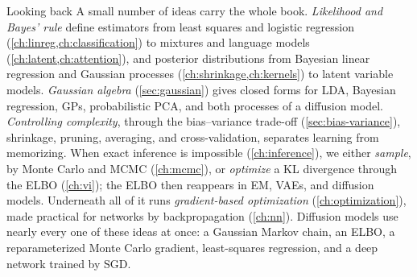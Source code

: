 \begin{notebox}{Looking back}
A small number of ideas carry the whole book. \emph{Likelihood and Bayes' rule} define estimators from least squares and logistic regression (\cref{ch:linreg,ch:classification}) to mixtures and language models (\cref{ch:latent,ch:attention}), and posterior distributions from Bayesian linear regression and Gaussian processes (\cref{ch:shrinkage,ch:kernels}) to latent variable models. \emph{Gaussian algebra} (\cref{sec:gaussian}) gives closed forms for LDA, Bayesian regression, GPs, probabilistic PCA, and both processes of a diffusion model. \emph{Controlling complexity}, through the bias--variance trade-off (\cref{sec:bias-variance}), shrinkage, pruning, averaging, and cross-validation, separates learning from memorizing. When exact inference is impossible (\cref{ch:inference}), we either \emph{sample}, by Monte Carlo and MCMC (\cref{ch:mcmc}), or \emph{optimize} a KL divergence through the ELBO (\cref{ch:vi}); the ELBO then reappears in EM, VAEs, and diffusion models. Underneath all of it runs \emph{gradient-based optimization} (\cref{ch:optimization}), made practical for networks by backpropagation (\cref{ch:nn}). Diffusion models use nearly every one of these ideas at once: a Gaussian Markov chain, an ELBO, a reparameterized Monte Carlo gradient, least-squares regression, and a deep network trained by SGD.
\end{notebox}
